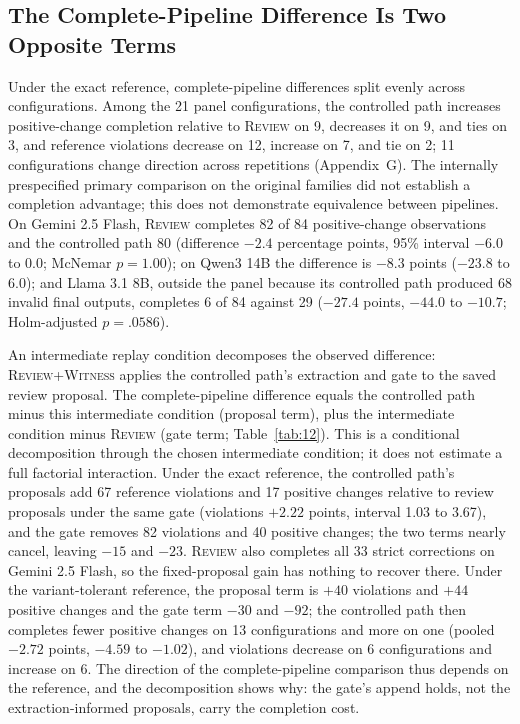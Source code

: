 \documentclass[acmsmall,review,anonymous]{acmart}
\newcommand{\witness}{\textsc{Witness}}
\newcommand{\review}{\textsc{Review}}
\begin{document}
\subsection{The Complete-Pipeline Difference Is Two Opposite Terms}\label{sec:pipeline}
Under the exact reference, complete-pipeline differences split evenly across configurations. Among the 21 panel configurations, the controlled path increases positive-change completion relative to \review{} on 9, decreases it on 9, and ties on 3, and reference violations decrease on 12, increase on 7, and tie on 2; 11 configurations change direction across repetitions (Appendix~G). The internally prespecified primary comparison on the original families did not establish a completion advantage; this does not demonstrate equivalence between pipelines. On Gemini 2.5 Flash, \review{} completes 82 of 84 positive-change observations and the controlled path 80 (difference $-2.4$ percentage points, 95\% interval $-6.0$ to $0.0$; McNemar $p=1.00$); on Qwen3 14B the difference is $-8.3$ points ($-23.8$ to $6.0$); and Llama 3.1 8B, outside the panel because its controlled path produced 68 invalid final outputs, completes 6 of 84 against 29 ($-27.4$ points, $-44.0$ to $-10.7$; Holm-adjusted $p=.0586$).

An intermediate replay condition decomposes the observed difference: \review{}+\witness{} applies the controlled path's extraction and gate to the saved review proposal. The complete-pipeline difference equals the controlled path minus this intermediate condition (proposal term), plus the intermediate condition minus \review{} (gate term; Table~\ref{tab:12}). This is a conditional decomposition through the chosen intermediate condition; it does not estimate a full factorial interaction. Under the exact reference, the controlled path's proposals add 67 reference violations and 17 positive changes relative to review proposals under the same gate (violations $+2.22$ points, interval 1.03 to 3.67), and the gate removes 82 violations and 40 positive changes; the two terms nearly cancel, leaving $-15$ and $-23$. \review{} also completes all 33 strict corrections on Gemini 2.5 Flash, so the fixed-proposal gain has nothing to recover there. Under the variant-tolerant reference, the proposal term is $+40$ violations and $+44$ positive changes and the gate term $-30$ and $-92$; the controlled path then completes fewer positive changes on 13 configurations and more on one (pooled $-2.72$ points, $-4.59$ to $-1.02$), and violations decrease on 6 configurations and increase on 6. The direction of the complete-pipeline comparison thus depends on the reference, and the decomposition shows why: the gate's append holds, not the extraction-informed proposals, carry the completion cost.
\end{document}
